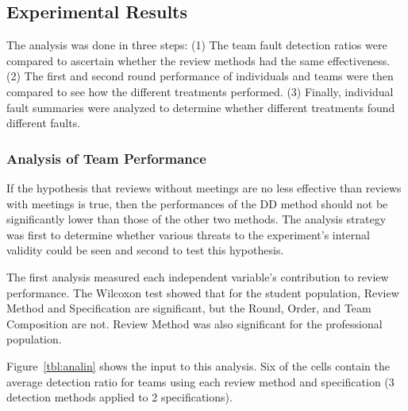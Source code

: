 \subsection{Experimental Results}
The analysis was done in three steps: (1) The team fault detection ratios 
were compared to ascertain whether the review methods had the same 
effectiveness. (2) The first and second round performance of individuals and teams 
were then compared to see how the different treatments performed. (3) Finally, 
individual fault summaries were analyzed to determine whether different treatments 
found different faults.

\subsubsection{Analysis of Team Performance}

If the hypothesis that reviews without meetings are
no less effective than reviews with meetings
is true, then the performances of the DD method
should not be significantly lower than those of the other two methods.  
The analysis strategy was first to determine whether various 
threats to the experiment's internal validity could be seen and 
second to test this hypothesis.

The first analysis measured each independent 
variable's contribution to review performance. 
The Wilcoxon test showed that for the student population,
Review Method and Specification are significant, but the Round, 
Order, and Team Composition are not.  Review Method was
also significant for the professional population. 

Figure~\ref{tbl:analin} shows the input to this analysis. Six of the cells 
contain the average detection ratio for teams using each review method 
and specification (3 detection methods applied to 2 specifications).  

